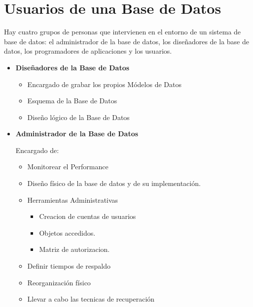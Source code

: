 \documentclass[12pt, fleqn]{report}                             %
\theoremstyle{break}                                            %
\begin{document}
        \section{Usuarios de una Base de Datos}


            Hay cuatro grupos de personas que intervienen en el entorno de un sistema de base de datos:
            el administrador de la base de datos, los diseñadores de la base de datos, los programadores
            de aplicaciones y los usuarios.

            \begin{itemize}

                \item
                    \textbf{Diseñadores de la Base de Datos}

                    \begin{itemize}
                        \item Encargado de grabar los propios Módelos de Datos
                        \item Esquema de la Base de Datos
                        \item Diseño lógico de la Base de Datos
                    \end{itemize}


                \item
                    \textbf{Administrador de la Base de Datos}

                    Encargado de: 

                        \begin{itemize}
                            \item Monitorear el Performance
                            \item Diseño físico de la base de datos y de su implementación.
                            \item Herramientas Administrativas
                                \begin{itemize}
                                    \item Creacion de cuentas de usuarios
                                    \item Objetos accedidos.
                                    \item Matriz de autorizacion.
                                \end{itemize}
                            \item Definir tiempos de respaldo
                            \item Reorganización físico
                            \item Llevar a cabo las tecnicas de recuperación
                        \end{itemize}


\end{itemize}
\end{document}
